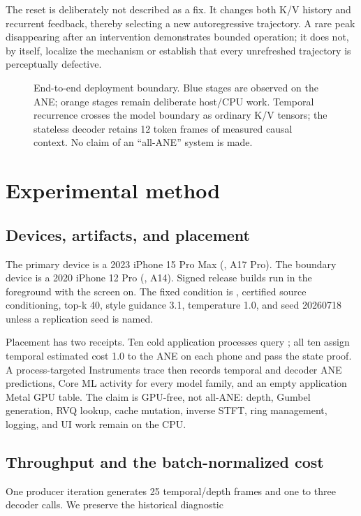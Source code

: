 \documentclass[10pt]{article}
\begin{document}
The reset is deliberately not described as a fix. It changes both K/V history and recurrent feedback, thereby selecting a new autoregressive trajectory. A rare peak disappearing after an intervention demonstrates bounded operation; it does not, by itself, localize the mechanism or establish that every unrefreshed trajectory is perceptually defective.


\begin{figure}[t]
  \centering
  \resizebox{\textwidth}{!}{}
  \caption{End-to-end deployment boundary. Blue stages are observed on the ANE;
  orange stages remain deliberate host/CPU work. Temporal recurrence crosses the
  model boundary as ordinary K/V tensors; the stateless decoder retains 12 token
  frames of measured causal context. No claim of an ``all-ANE'' system is made.}
  \label{fig:system}
\end{figure}

\section{Experimental method}
\subsection{Devices, artifacts, and placement}
The primary device is a 2023 iPhone 15 Pro Max (\texttt{}, A17 Pro). The boundary device is a 2020 iPhone 12 Pro (\texttt{}, A14). Signed release builds run in the foreground with the screen on. The fixed condition is \texttt{}, certified \texttt{} source conditioning, top-k 40, style guidance 3.1, temperature 1.0, and seed 20260718 unless a replication seed is named.

Placement has two receipts. Ten cold application processes query \texttt{}; all ten assign temporal estimated cost 1.0 to the ANE on each phone and pass the state proof. A process-targeted Instruments trace then records temporal and decoder ANE predictions, Core ML activity for every model family, and an empty application Metal GPU table. The claim is GPU-free, not all-ANE: depth, Gumbel generation, RVQ lookup, cache mutation, inverse STFT, ring management, logging, and UI work remain on the CPU.

\subsection{Throughput and the batch-normalized cost}
One producer iteration generates 25 temporal/depth frames and one to three decoder calls. We preserve the historical diagnostic
\end{document}
